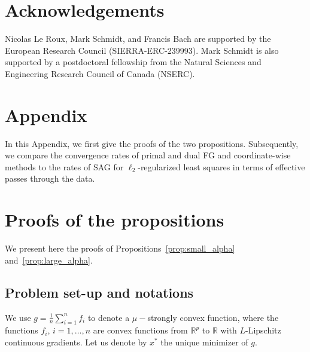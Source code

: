 \documentclass{article}
\newcommand{\rb}{\mathbb{R}}
\def\norm#1{\|#1\|}
\begin{document}


\section*{Acknowledgements}


Nicolas Le Roux, Mark Schmidt, and Francis Bach are supported by the European Research Council (SIERRA-ERC-239993).  Mark Schmidt is also supported by a postdoctoral fellowship from the Natural Sciences and Engineering Research Council of Canada (NSERC).

\newpage

\appendix

\section*{Appendix}


In this Appendix, we first give the proofs of the two propositions. Subsequently, we compare the convergence rates of primal and dual FG and coordinate-wise methods to the rates of SAG for $\ell_2$-regularized least squares in terms of effective passes through the data.

\section{Proofs of the propositions}
We present here the proofs of Propositions~\ref{prop:small_alpha} and~\ref{prop:large_alpha}.


\subsection{Problem set-up and notations}
We use $g = \frac{1}{n}\sum_{i=1}^n f_i$ to denote a $\mu-$strongly convex function, where the functions $f_i$, $i=1,\ldots,n$ are convex functions from $\rb^p$ to $\rb$ with $L$-Lipschitz continuous gradients. Let us denote by $x^\ast$ the unique minimizer of $g$.
\end{document}
